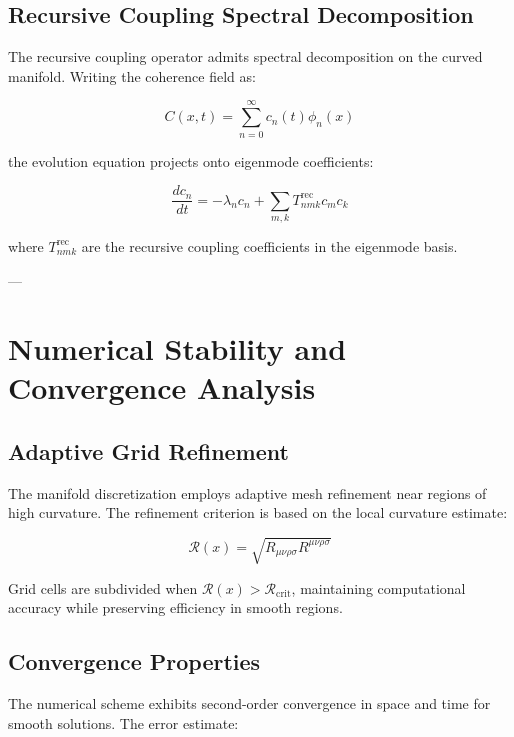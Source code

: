 \subsection{Recursive Coupling Spectral Decomposition}

The recursive coupling operator admits spectral decomposition on the curved manifold. Writing the coherence field as:

\begin{equation}
C(x,t) = \sum_{n=0}^{\infty} c_n(t) \phi_n(x)
\end{equation}

the evolution equation projects onto eigenmode coefficients:

\begin{equation}
\frac{dc_n}{dt} = -\lambda_n c_n + \sum_{m,k} T^{\text{rec}}_{nmk} c_m c_k
\end{equation}

where $T^{\text{rec}}_{nmk}$ are the recursive coupling coefficients in the eigenmode basis.

---

\section{Numerical Stability and Convergence Analysis}

\subsection{Adaptive Grid Refinement}

The manifold discretization employs adaptive mesh refinement near regions of high curvature. The refinement criterion is based on the local curvature estimate:

\begin{equation}
\mathcal{R}(x) = \sqrt{R_{\mu\nu\rho\sigma}R^{\mu\nu\rho\sigma}}
\end{equation}

Grid cells are subdivided when $\mathcal{R}(x) > \mathcal{R}_{\text{crit}}$, maintaining computational accuracy while preserving efficiency in smooth regions.

\subsection{Convergence Properties}

The numerical scheme exhibits second-order convergence in space and time for smooth solutions. The error estimate:

